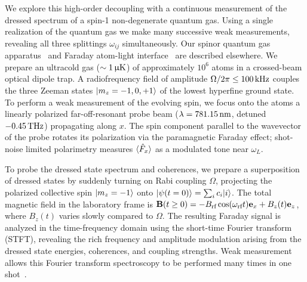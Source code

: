 \documentclass[aps,prl,reprint,superscriptaddress,floatfix]{revtex4-1}
\begin{document}
We explore this high-order decoupling with a continuous measurement of the dressed spectrum of a spin-1 non-degenerate quantum gas.
Using a single realization of the quantum gas we make many successive weak measurements, revealing all three splittings $\omega_{ij}$ simultaneously.
Our spinor quantum gas apparatus~\cite{wood_magnetic_2015} and Faraday atom-light interface~\cite{jasperse_magic-wavelength_2017} are described elsewhere.
We prepare an ultracold gas ($\sim \unit[1]{\upmu K}$) of approximately $10^6$ \Rb atoms in a crossed-beam optical dipole trap.
A radiofrequency field of amplitude $\Omega/2\pi \leq \unit[100]{kHz}$ couples the three Zeeman states $\vert m_z=-1,0,+1 \rangle $ of the lowest hyperfine ground state.
To perform a weak measurement of the evolving spin, we focus onto the atoms a linearly polarized far-off-resonant probe beam ($\lambda=\unit[781.15]{nm}$, detuned $-\unit[0.45]{THz}$) propagating along $x$.
The spin component parallel to the wavevector of the probe rotates its polarization via the paramagnetic Faraday effect; shot-noise limited polarimetry measures $\langle \hat{F}_x \rangle$ as a modulated tone near $\omega_L$.

To probe the dressed state spectrum and coherences, we prepare a superposition of dressed states by suddenly turning on Rabi coupling $\Omega$, projecting the polarized collective spin $\vert m_z=-1 \rangle $ onto $\vert \psi(t=0) \rangle  = \sum_i c_i \vert i \rangle $.
The total magnetic field in the laboratory frame is $\mathbf{B}(t \geq 0) = -B_{\text{rf}} \cos (\omega_{\text{rf}} t) \mathbf{e}_x + B_z(t) \mathbf{e}_z$, where $B_z(t)$ varies slowly compared to $\Omega$.
The resulting Faraday signal is analyzed in the time-frequency domain using the short-time Fourier transform (STFT), revealing the rich frequency and amplitude modulation arising from the dressed state energies, coherences, and coupling strengths.
Weak measurement allows this Fourier transform spectroscopy to be performed many times in one shot~\cite[cf.]{valdes-curiel_fourier_2017}.
\end{document}
